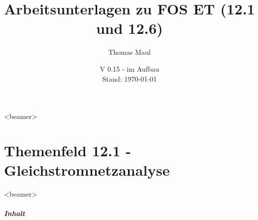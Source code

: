 \documentclass[a4paper, 10pt]{scrartcl}
\title{Arbeitsunterlagen zu FOS ET (12.1 und 12.6)}
\date{V 0.15 - im Aufbau\\ Stand: \today}%
\institute[BWS Hofheim]{Brühlwiesenschule, Hofheim}
\author{Thomas Maul}
\begin{document}
\begin{frame}<beamer>
  \titlepage
\end{frame}


\part{Themenfeld 12.1 - Gleichstromnetzanalyse}
\begin{frame}
  \partpage
\end{frame}
\begin{frame}<beamer>
      \frametitle{Inhalt}
  \begin{columns}
    \tableofcontents[sections={1-3},hidesubsections]%
    \tableofcontents[sections={4-},hidesubsections]%
  \end{columns}
\end{frame}
\end{document}
